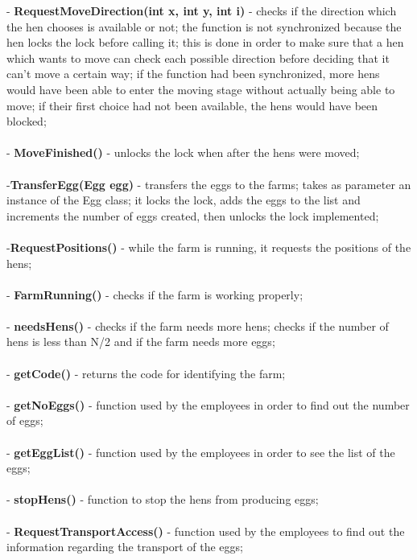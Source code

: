 \documentclass{article}
\begin{document}
\begin{itemize}
- \textbf {RequestMoveDirection(int x, int y, int i)} - checks if the direction which the hen chooses is available or not; the function is not synchronized because the hen locks the lock before calling it;
this is done in order to make sure that a hen which wants to move can check each possible direction before deciding that it can't move a certain way; if the function had been synchronized, more hens would have been able to enter the moving stage without actually being able to move; if their first choice had not been available, the hens would have been blocked; \\  \\
- \textbf {MoveFinished()} - unlocks the lock when after the hens were moved; \\  \\
-\textbf {TransferEgg(Egg egg)} - transfers the eggs to the farms; takes as parameter an instance of the Egg class; it locks the  lock, adds the eggs to the list and increments the number of eggs created, then unlocks the lock implemented; \\  \\
-\textbf {RequestPositions()} - while the farm is running, it requests the positions of the hens; \\  \\
- \textbf {FarmRunning()} - checks if the farm is working properly; \\  \\
- \textbf {needsHens()} - checks if the farm needs more hens; checks if the number of hens is less than N/2 and if the farm needs more eggs; \\  \\
- \textbf {getCode()} - returns the code for identifying the farm; \\  \\
- \textbf {getNoEggs()} - function used by the employees in order to find out the number of eggs; \\  \\
- \textbf {getEggList()} - function used by the employees in order to see the list of the eggs; \\  \\
- \textbf {stopHens()} - function to stop the hens from producing eggs; \\  \\
- \textbf {RequestTransportAccess()} - function used by the employees to find out the information regarding the transport of the eggs; \\  \\

\end{itemize}
\end{document}
